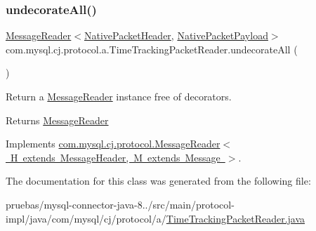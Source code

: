 \mbox{\label{classcom_1_1mysql_1_1cj_1_1protocol_1_1a_1_1_time_tracking_packet_reader_ab320fc6184aad94ebdba7260b574421f}} 
\subsubsection{\texorpdfstring{undecorate\+All()}{undecorateAll()}}
{\footnotesize\ttfamily \mbox{\hyperlink{interfacecom_1_1mysql_1_1cj_1_1protocol_1_1_message_reader}{Message\+Reader}}$<$\mbox{\hyperlink{classcom_1_1mysql_1_1cj_1_1protocol_1_1a_1_1_native_packet_header}{Native\+Packet\+Header}}, \mbox{\hyperlink{classcom_1_1mysql_1_1cj_1_1protocol_1_1a_1_1_native_packet_payload}{Native\+Packet\+Payload}}$>$ com.\+mysql.\+cj.\+protocol.\+a.\+Time\+Tracking\+Packet\+Reader.\+undecorate\+All (\begin{DoxyParamCaption}{ }\end{DoxyParamCaption})}

Return a \mbox{\hyperlink{interfacecom_1_1mysql_1_1cj_1_1protocol_1_1_message_reader}{Message\+Reader}} instance free of decorators.

\begin{DoxyReturn}{Returns}
\mbox{\hyperlink{interfacecom_1_1mysql_1_1cj_1_1protocol_1_1_message_reader}{Message\+Reader}} 
\end{DoxyReturn}


Implements \mbox{\hyperlink{interfacecom_1_1mysql_1_1cj_1_1protocol_1_1_message_reader_a22a326215a91e4d7bff08d1f2c3e1b6d}{com.\+mysql.\+cj.\+protocol.\+Message\+Reader$<$ H extends Message\+Header, M extends Message $>$}}.



The documentation for this class was generated from the following file\+:\begin{DoxyCompactItemize}
\item 
pruebas/mysql-\/connector-\/java-\/8../src/main/protocol-\/impl/java/com/mysql/cj/protocol/a/\mbox{\hyperlink{_time_tracking_packet_reader_8java}{Time\+Tracking\+Packet\+Reader.\+java}}\end{DoxyCompactItemize}
